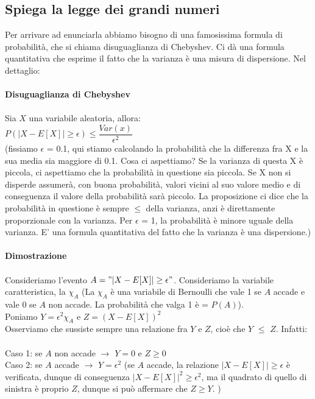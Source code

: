 \documentclass[a4paper,12pt]{report}
\begin{document}
	\subsection{Spiega la legge dei grandi numeri}
	Per arrivare ad enunciarla abbiamo bisogno di una famosissima formula di probabilità, che si chiama disuguaglianza di Chebyshev. Ci dà una formula quantitativa che esprime il fatto che la varianza è una misura di dispersione. Nel dettaglio:\\\\
	\textbf{Disuguaglianza di Chebyshev} \\\\
	Sia $X$ una variabile aleatoria, allora: \\
	$P(|X - E[X]| \geq \epsilon) \leq \dfrac{Var(x)}{\epsilon^2}$\\
	(fissiamo $\epsilon$ = 0.1, qui stiamo calcolando la probabilità che la differenza fra X e la sua media sia maggiore di 0.1. Cosa ci aspettiamo? Se la varianza di questa X è piccola, ci aspettiamo che la probabilità in questione sia piccola. Se X non si disperde assumerà, con buona probabilità, valori vicini al suo valore medio e di conseguenza il valore della probabilità sarà piccolo. La proposizione ci dice che la probabilità in questione è sempre $\leq$ della varianza, anzi è direttamente proporzionale con la varianza. Per $\epsilon$ = 1, la probabilità è minore uguale della varianza. E' una formula quantitativa del fatto che la varianza è una dispersione.)\\\\
	\textbf{Dimostrazione} \\\\
	Consideriamo l'evento $A = "|X - E[X]| \geq \epsilon"$. Consideriamo la variabile caratteristica, la $\chi_{A}$ (La $\chi_{A}$ è una variabile di Bernoulli che vale 1 se $A$ accade e vale 0 se $A$ non accade. La probabilità che valga 1 è = $P(A)$). \\
	Poniamo $Y = \epsilon^2 \chi_{A}$ e $Z = (X - E[X])^2$ \\
	Osserviamo che sussiste sempre una relazione fra $Y$ e $Z$, cioè che $Y$ $\leq$ $Z$. Infatti: \\\\
	Caso 1: se $A$ non accade $\rightarrow$ $Y=0$ e $Z \geq 0$ \\
	Caso 2: se $A$ accade $\rightarrow$ $Y=\epsilon^2$
	(se $A$ accade, la relazione $|X - E[X]| \geq \epsilon$ è verificata, dunque di conseguenza $|X-E[X]|^2 \geq \epsilon^2$, ma il quadrato di quello di sinistra è proprio $Z$, dunque si può affermare che $Z \ge Y$. )\\\\
\end{document}
